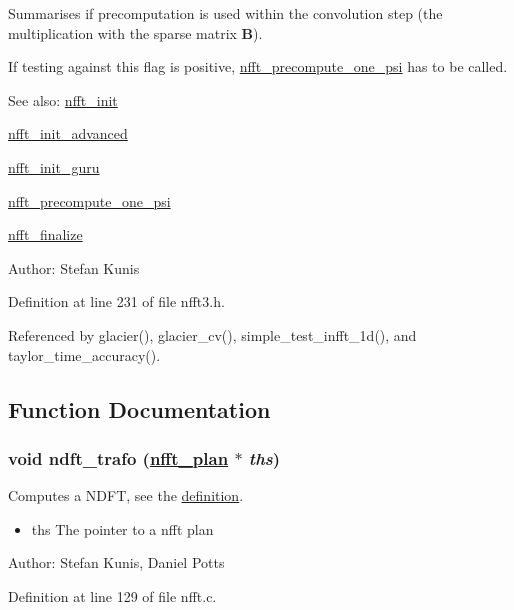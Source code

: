 Summarises if precomputation is used within the convolution step (the multiplication with the sparse matrix $\mathbf{B}$). 

If testing against this flag is positive, \hyperlink{group__nfft_ga10}{nfft\_\-precompute\_\-one\_\-psi} has to be called.

\begin{Desc}
\item[See also:]\hyperlink{group__nfft_ga7}{nfft\_\-init} 

\hyperlink{group__nfft_ga8}{nfft\_\-init\_\-advanced} 

\hyperlink{group__nfft_ga9}{nfft\_\-init\_\-guru} 

\hyperlink{group__nfft_ga10}{nfft\_\-precompute\_\-one\_\-psi} 

\hyperlink{group__nfft_ga15}{nfft\_\-finalize} \end{Desc}
\begin{Desc}
\item[Author:]Stefan Kunis \end{Desc}


Definition at line 231 of file nfft3.h.

Referenced by glacier(), glacier\_\-cv(), simple\_\-test\_\-infft\_\-1d(), and taylor\_\-time\_\-accuracy().

\subsection{Function Documentation}
\hypertarget{group__nfft_ga0}{
\subsubsection[ndft\_\-trafo]{\setlength{\rightskip}{0pt plus 5cm}void ndft\_\-trafo (\hyperlink{structnfft__plan}{nfft\_\-plan} $\ast$ {\em ths})}}
\label{group__nfft_ga0}


Computes a NDFT, see the \hyperlink{group__nfft_ndft_formula}{definition}. 

\begin{itemize}
\item ths The pointer to a nfft plan\end{itemize}
\begin{Desc}
\item[Author:]Stefan Kunis, Daniel Potts \end{Desc}


Definition at line 129 of file nfft.c.

